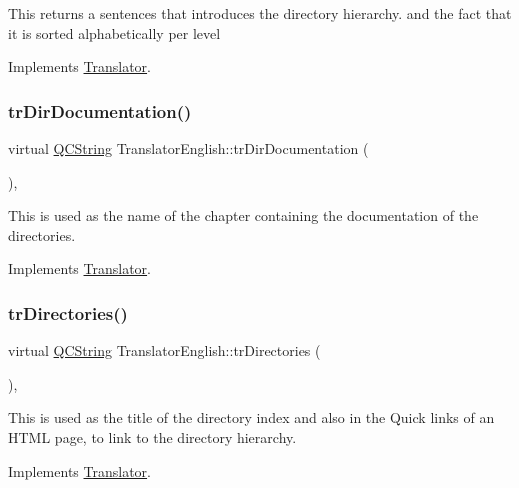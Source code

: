 This returns a sentences that introduces the directory hierarchy. and the fact that it is sorted alphabetically per level 

Implements \mbox{\hyperlink{class_translator}{Translator}}.

\mbox{\label{class_translator_english_af5e209ccded219d9ddb4613cf7edf124}} 
\subsubsection{\texorpdfstring{trDirDocumentation()}{trDirDocumentation()}}
{\footnotesize\ttfamily virtual \mbox{\hyperlink{class_q_c_string}{Q\+C\+String}} Translator\+English\+::tr\+Dir\+Documentation (\begin{DoxyParamCaption}{ }\end{DoxyParamCaption})\hspace{0.3cm}{\ttfamily [inline]}, {\ttfamily [virtual]}}

This is used as the name of the chapter containing the documentation of the directories. 

Implements \mbox{\hyperlink{class_translator}{Translator}}.

\mbox{\label{class_translator_english_a65cc1a9c482284d6297839f6a989890a}} 
\subsubsection{\texorpdfstring{trDirectories()}{trDirectories()}}
{\footnotesize\ttfamily virtual \mbox{\hyperlink{class_q_c_string}{Q\+C\+String}} Translator\+English\+::tr\+Directories (\begin{DoxyParamCaption}{ }\end{DoxyParamCaption})\hspace{0.3cm}{\ttfamily [inline]}, {\ttfamily [virtual]}}

This is used as the title of the directory index and also in the Quick links of an H\+T\+ML page, to link to the directory hierarchy. 

Implements \mbox{\hyperlink{class_translator}{Translator}}.

